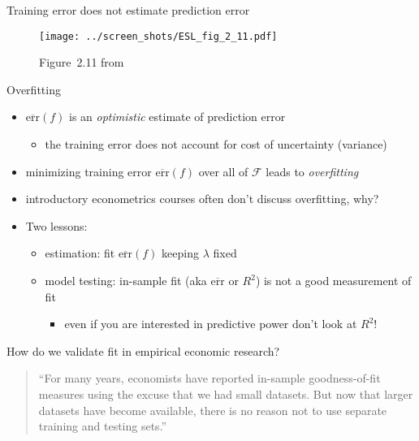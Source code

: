 \documentclass[xcolor=dvipsnames]{beamer}
\begin{document}
\begin{frame}{Training error does not estimate prediction error}
\begin{figure}
  \texttt{[image: ../screen\_shots/ESL\_fig\_2\_11.pdf]}
   \caption{Figure~2.11 from \textcite{hastie2009elements}}
\end{figure}
\end{frame}


\begin{frame}{Overfitting}
\begin{itemize}
  \item $\overline{\text{err}} (f)$ is an \emph{optimistic} estimate of prediction error
  \begin{itemize}
    \item the training error does not account for cost of uncertainty (variance)
  \end{itemize}
\pause
  \item minimizing training error $\overline{\text{err}} (f)$ over all of $\mathcal{F}$ leads to \emph{overfitting}
\pause 
  \item introductory econometrics courses often don't discuss overfitting, why? 
\pause
  \item Two lessons: 
  \begin{itemize}
    \pause\item estimation: fit $\overline{\text{err}} (f)$ keeping $\lambda$ fixed
    \pause\item model testing: in-sample fit (aka $\overline{\text{err}}$ or $R^2$) is not a good measurement of fit
    \begin{itemize}
      \item even if you are interested in predictive power don't look at $R^2$!
    \end{itemize}
  \end{itemize}
\end{itemize}
\end{frame}


\begin{frame}{How do we validate fit in empirical economic research?}
\begin{quote}
``For many years, economists have reported in-sample goodness-of-fit measures using the excuse that we had small datasets. But now that larger datasets have become available, there is no reason not to use separate training and testing sets.'' \parencite{varian2014big}
\end{quote}
\end{frame}
\end{document}

